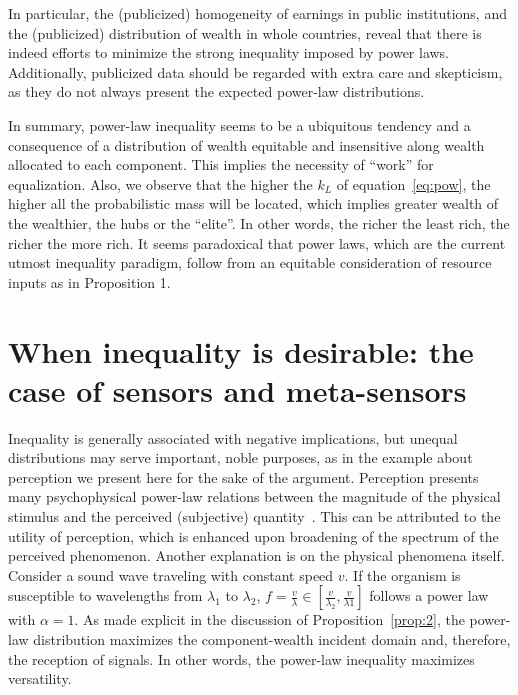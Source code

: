 \documentclass[10pt,letterpaper]{article}
\begin{document}
In particular, the (publicized)
homogeneity of earnings in public institutions,
and the (publicized) distribution of wealth in whole countries,
reveal that there is indeed efforts to minimize
the strong inequality imposed by power laws.
Additionally, publicized data should be regarded with
extra care and skepticism, as they do not always present the
expected power-law distributions.

In summary, power-law inequality seems to be a ubiquitous tendency
and a consequence of a distribution of wealth equitable and insensitive along wealth allocated to each component.
This implies the necessity of ``work'' for equalization.
Also, we observe that the higher the $k_L$ of equation~\ref{eq:pow}, the higher all the probabilistic mass will be located, which
implies greater wealth of the wealthier, the hubs or the ``elite''.
In other words, the richer the least rich,
the richer the more rich. It seems paradoxical that power laws, which are the current utmost inequality paradigm, follow from an equitable consideration of resource inputs as in Proposition 1.


\section{When inequality is desirable: the case of sensors and meta-sensors}\label{sec:meta}

Inequality is generally associated with negative implications, but unequal distributions may serve important, noble purposes, as in the example about perception we present here for the sake of the argument.  
Perception presents many psychophysical power-law relations between the magnitude of the physical stimulus and the perceived (subjective) quantity~\cite{pbook}. This can be attributed to the utility of perception, which is enhanced upon broadening of the spectrum of the perceived phenomenon. Another explanation is on the physical phenomena itself. Consider a sound wave traveling with constant speed $v$.
If the organism is susceptible to wavelengths from $\lambda_1$
to $\lambda_2$, $f=\frac{v}{\lambda} \in [\frac{v}{\lambda_2},\frac{v}{\lambda1}]$ follows a power law with $\alpha=1$. As made explicit in the discussion of Proposition~\ref{prop:2}, the power-law distribution
maximizes the component-wealth incident domain and,
therefore, the reception of signals.
In other words, the power-law inequality
maximizes versatility.
\end{document}
